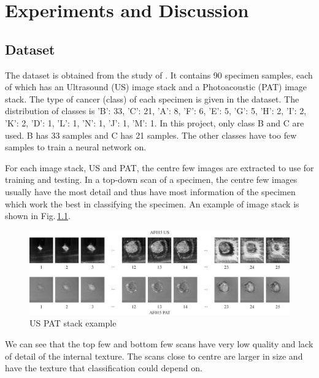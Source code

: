 \chapter{Experiments and Discussion} 

\section{Dataset}
The dataset is obtained from the study of \cite{Kosik2019}. It contains 90 specimen samples, each of which has an Ultrasound (US) image stack and a Photoacoustic (PAT) image stack. The type of cancer (class) of each specimen is given in the dataset. The distribution of classes is 
{'B': 33, 'C': 21, 'A': 8, 'F': 6, 'E': 5, 'G': 5, 'H': 2, 'I': 2, 'K': 2, 'D': 1, 'L': 1, 'N': 1, 'J': 1, 'M': 1}.  
In this project, only class B and C are used. B has 33 samples and C has 21 samples. The other classes have too few samples to train a neural network on. 

For each image stack, US and PAT, the centre few images are extracted to use for training and testing. In a top-down scan of a specimen, the centre few images usually have the most detail and thus have most information of the specimen which work the best in classifying the specimen. An example of image stack is shown in Fig.\,\ref{stack}.

\begin{figure}[h]
	\centering
	\includegraphics[width=\textwidth]{Figs/stack.jpg}
    \caption{US PAT stack example}
    \label{stack}
\end{figure}

We can see that the top few and bottom few scans have very low quality and lack of detail of the internal texture. The scans close to centre are larger in size and have the texture that classification could depend on.


